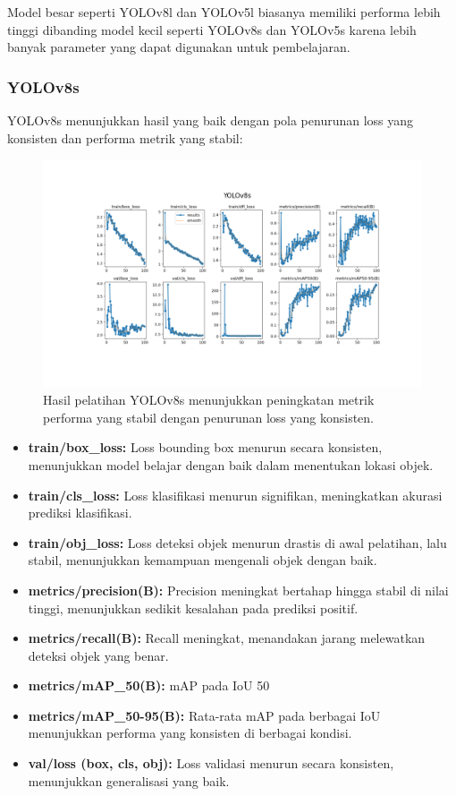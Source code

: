 \documentclass[12pt,a4paper]{article}
\begin{document}
Model besar seperti YOLOv8l dan YOLOv5l biasanya memiliki performa lebih tinggi dibanding model kecil seperti YOLOv8s dan YOLOv5s karena lebih banyak parameter yang dapat digunakan untuk pembelajaran.

\subsubsection{YOLOv8s}
YOLOv8s menunjukkan hasil yang baik dengan pola penurunan loss yang konsisten dan performa metrik yang stabil:

\begin{figure}[H]
    \centering
    \includegraphics[width=0.6\linewidth]{assets/yolov8s_results.png}
    \caption{Hasil pelatihan YOLOv8s menunjukkan peningkatan metrik performa yang stabil dengan penurunan loss yang konsisten.}
    \label{fig:yolov8s_results}
\end{figure}

\begin{itemize}
    \item \textbf{train/box\_loss:} Loss bounding box menurun secara konsisten, menunjukkan model belajar dengan baik dalam menentukan lokasi objek.
    \item \textbf{train/cls\_loss:} Loss klasifikasi menurun signifikan, meningkatkan akurasi prediksi klasifikasi.
    \item \textbf{train/obj\_loss:} Loss deteksi objek menurun drastis di awal pelatihan, lalu stabil, menunjukkan kemampuan mengenali objek dengan baik.
    \item \textbf{metrics/precision(B):} Precision meningkat bertahap hingga stabil di nilai tinggi, menunjukkan sedikit kesalahan pada prediksi positif.
    \item \textbf{metrics/recall(B):} Recall meningkat, menandakan jarang melewatkan deteksi objek yang benar.
    \item \textbf{metrics/mAP\_50(B):} mAP pada IoU 50%
    \item \textbf{metrics/mAP\_50-95(B):} Rata-rata mAP pada berbagai IoU menunjukkan performa yang konsisten di berbagai kondisi.
    \item \textbf{val/loss (box, cls, obj):} Loss validasi menurun secara konsisten, menunjukkan generalisasi yang baik.
\end{itemize}
\end{document}
